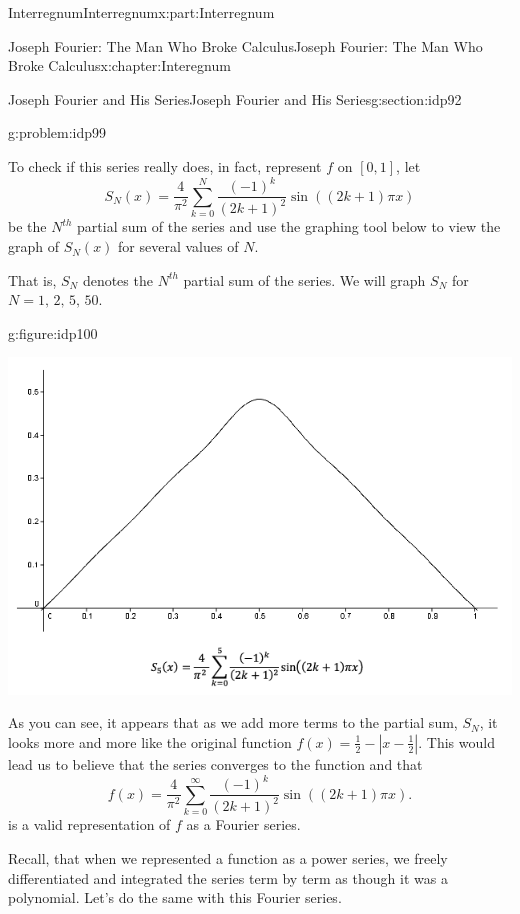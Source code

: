 \documentclass[oneside,10pt,]{book}
\numberwithin{equation}{section}
\newcommand{\abs}[1]{\left|#1\right|}
\begin{document}
\begin{partptx}{Interregnum}{}{Interregnum}{}{}{x:part:Interregnum}
\begin{chapterptx}{Joseph Fourier: The Man Who Broke Calculus}{}{Joseph Fourier: The Man Who Broke Calculus}{}{}{x:chapter:Interegnum}
\begin{sectionptx}{Joseph Fourier and His Series}{}{Joseph Fourier and His Series}{}{}{g:section:idp92}
\begin{problem}{}{g:problem:idp99}
%
\end{problem}
To check if this series really does, in fact, represent \(f\) on \([0,1]\), let%
\begin{equation*}
S_N(x)=\frac{4}{\pi^2}\sum_{k=0}^N\frac{\left(-1\right)^k}{\left(2k+1\right)^2} \sin\left(\left(2k+1\right)\pi x\right)
\end{equation*}
be the \(N^{th}\) partial sum of the series and use the graphing tool below to view the graph of \(S_N(x)\) for several values of \(N\).%
\par
That is, \(S_N\) denotes the \(N^{th}\) partial sum of the series. We will graph \(S_N\) for \(N=1,\,2,\,5,\,50\).%
\par
\begin{figureptx}{}{g:figure:idp100}{}%
\centering
\begin{image}{0}{1}{0}%
\includegraphics[width=\linewidth]{images/FourierEx4.png}
\end{image}%
\tcblower
\end{figureptx}%
As you can see, it appears that as we add more terms to the partial sum, \(S_N\), it looks more and more like the original function \(f(x)=\frac{1}{2}-\abs{x-\frac{1}{2}}\). This would lead us to believe that the series converges to the function and that%
\begin{equation}
f(x)=\frac{4}{\pi^2}\sum_{k=0}^\infty\frac{\left(-1\right)^k}{\left(2k+1\right)^2}\sin\left(\left(2k+1\right)\pi x\right)\text{.}\label{x:men:PDE_sol}
\end{equation}
is a valid representation of \(f\) as a Fourier series.%
\par
Recall, that when we represented a function as a power series, we freely differentiated and integrated the series term by term as though it was a polynomial. Let's do the same with this Fourier series.%

\end{sectionptx}
\end{chapterptx}
\end{partptx}
\end{document}
